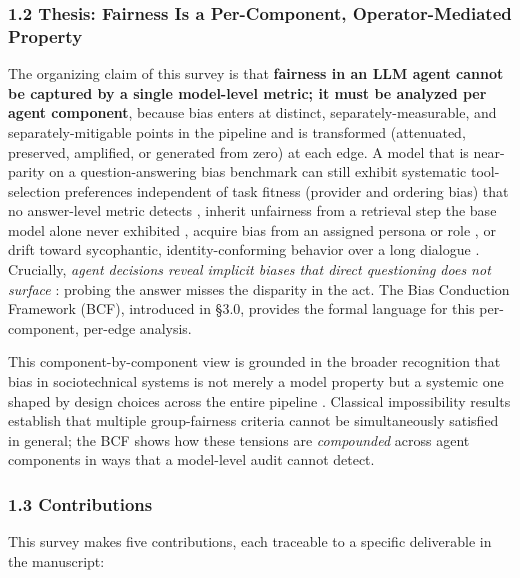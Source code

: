\documentclass[10pt]{article}
\begin{document}
\subsubsection*{1.2 Thesis: Fairness Is a Per-Component, Operator-Mediated Property}

The organizing claim of this survey is that \textbf{fairness in an LLM agent cannot be captured by a single model-level metric; it must be analyzed per agent component}, because bias enters at distinct, separately-measurable, and separately-mitigable points in the pipeline and is transformed (attenuated, preserved, amplified, or generated from zero) at each edge. A model that is near-parity on a question-answering bias benchmark can still exhibit systematic tool-selection preferences independent of task fitness (provider and ordering bias) that no answer-level metric detects \cite{blankenstein2025biasbusters}, inherit unfairness from a retrieval step the base model alone never exhibited \cite{wu2024rag,hu2024free}, acquire bias from an assigned persona or role \cite{gupta2023bias,cao2026from}, or drift toward sycophantic, identity-conforming behavior over a long dialogue \cite{liu2025truth,ma2026implicit}. Crucially, \emph{agent decisions reveal implicit biases that direct questioning does not surface} \cite{li2025actions}: probing the answer misses the disparity in the act. The Bias Conduction Framework (BCF), introduced in \S{}3.0, provides the formal language for this per-component, per-edge analysis.

This component-by-component view is grounded in the broader recognition that bias in sociotechnical systems is not merely a model property but a systemic one shaped by design choices across the entire pipeline \cite{selbst2019fairness,blodgett2020language}. Classical impossibility results \cite{kleinberg2017inherent,chouldechova2017fair} establish that multiple group-fairness criteria cannot be simultaneously satisfied in general; the BCF shows how these tensions are \emph{compounded} across agent components in ways that a model-level audit cannot detect.

\subsubsection*{1.3 Contributions}

This survey makes five contributions, each traceable to a specific deliverable in the manuscript:
\end{document}
